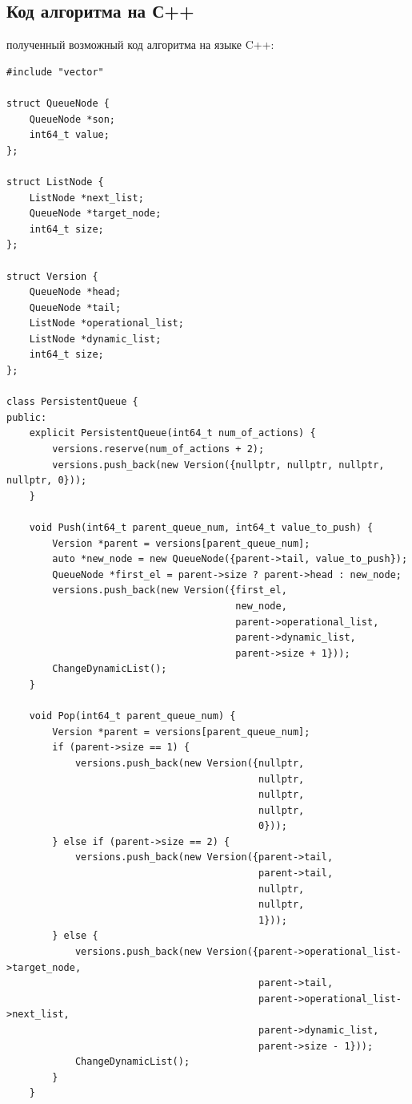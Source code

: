 \documentclass[a4paper,12pt]{extarticle}
\begin{document}
\subsection{Код алгоритма на С++}
 полученный возможный код алгоритма на языке C++:
\begin{lstlisting}
#include "vector"

struct QueueNode {
    QueueNode *son;
    int64_t value;
};

struct ListNode {
    ListNode *next_list;
    QueueNode *target_node;
    int64_t size;
};

struct Version {
    QueueNode *head;
    QueueNode *tail;
    ListNode *operational_list;
    ListNode *dynamic_list;
    int64_t size;
};

class PersistentQueue {
public:
    explicit PersistentQueue(int64_t num_of_actions) {
        versions.reserve(num_of_actions + 2);
        versions.push_back(new Version({nullptr, nullptr, nullptr, nullptr, 0}));
    }

    void Push(int64_t parent_queue_num, int64_t value_to_push) {
        Version *parent = versions[parent_queue_num];
        auto *new_node = new QueueNode({parent->tail, value_to_push});
        QueueNode *first_el = parent->size ? parent->head : new_node;
        versions.push_back(new Version({first_el,
                                        new_node,
                                        parent->operational_list,
                                        parent->dynamic_list,
                                        parent->size + 1}));
        ChangeDynamicList();
    }

    void Pop(int64_t parent_queue_num) {
        Version *parent = versions[parent_queue_num];
        if (parent->size == 1) {
            versions.push_back(new Version({nullptr,
                                            nullptr,
                                            nullptr,
                                            nullptr,
                                            0}));
        } else if (parent->size == 2) {
            versions.push_back(new Version({parent->tail,
                                            parent->tail,
                                            nullptr,
                                            nullptr,
                                            1}));
        } else {
            versions.push_back(new Version({parent->operational_list->target_node,
                                            parent->tail,
                                            parent->operational_list->next_list,
                                            parent->dynamic_list,
                                            parent->size - 1}));
            ChangeDynamicList();
        }
    }


\end{lstlisting}
\end{document}

